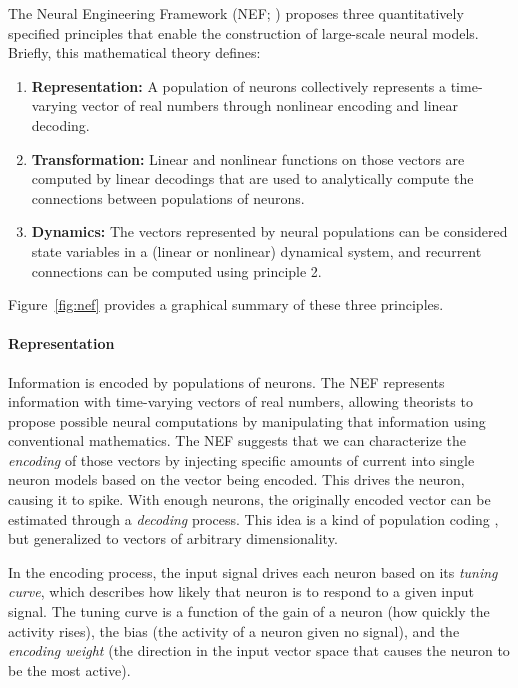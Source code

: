\documentclass{frontiersSCNS}
\begin{document}
The Neural Engineering Framework (NEF; \citealp{eliasmith2003})
proposes three quantitatively specified principles
that enable the construction
of large-scale neural models.
Briefly, this mathematical theory defines:
\begin{enumerate}
  \item \textbf{Representation:} A population of neurons
    collectively represents a time-varying vector of real numbers
    through nonlinear encoding and linear decoding.
  \item \textbf{Transformation:} Linear and nonlinear
    functions on those vectors
    are computed by linear decodings
    that are used to analytically compute
    the connections between populations of neurons.
  \item \textbf{Dynamics:} The vectors represented
    by neural populations can be considered state variables
    in a (linear or nonlinear) dynamical system,
    and recurrent connections can be computed
    using principle 2.
\end{enumerate}
Figure~\ref{fig:nef} provides a graphical
summary of these three principles.

\paragraph{Representation}
Information is encoded by populations of neurons.
The NEF represents information
with time-varying vectors of real numbers,
allowing theorists to propose possible
neural computations by
manipulating that information
using conventional mathematics.
The NEF suggests that we can characterize
the \textit{encoding} of
those vectors by injecting
specific amounts of current into
single neuron models based on
the vector being encoded.
This drives the neuron,
causing it to spike.
With enough neurons,
the originally encoded vector
can be estimated
through a \textit{decoding} process.
This idea is a kind of population coding
\citep{georgopoulos1986, salinas1994}, but generalized
to vectors of arbitrary dimensionality.

In the encoding process, the input signal drives
each neuron based on its \textit{tuning curve},
which describes how likely
that neuron is to respond to a given input signal.
The tuning curve is a function of the gain
of a neuron (how quickly the activity rises),
the bias (the activity of a neuron given no signal),
and the \textit{encoding weight}
(the direction in the input vector space
that causes the neuron to be the most active).
\end{document}
